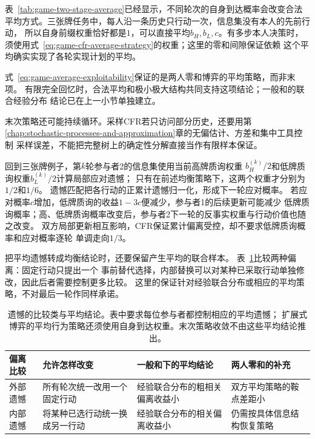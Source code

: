 表~\ref{tab:game-two-stage-average}已经显示，不同轮次的自身到达概率会改变合法
平均方式。三张牌任务中，每人沿一条历史只行动一次，信息集没有本人的先前行动，
所以自身前缀权重恰好都是\(1\)，可以直接平均\(b_H,b_L,c\)。有多步本人决策时，
须使用式~\eqref{eq:game-cfr-average-strategy}的权重；这里的零和间隙保证依赖
这个平均确实实现了各轮实现计划的平均。

式~\eqref{eq:game-average-exploitability}保证的是两人零和博弈的平均策略，而非末项。
有限完全回忆时，合法平均和极小极大结构共同支持这项结论；一般和的联合经验分布
结论已在上一小节单独建立。

末次策略还可能持续循环。采样CFR若只访问部分历史，还要用第
\ref{chap:stochastic-processes-and-approximation}章的无偏估计、方差和集中工具控制
采样误差，不能把完整树上的确定性分解直接当作有限样本保证。

回到三张牌例子，第\(k\)轮参与者2的信息集使用当前高牌质询权重
\(b_H^{(k)}/2\)和低牌质询权重\(b_L^{(k)}/2\)计算局部应对遗憾；
只有在前述均衡策略下，这两个权重才分别为\(1/2\)和\(1/6\)。
遗憾匹配把各行动的正累计遗憾归一化，形成下一轮应对概率。
若应对概率\(c\)增加，低牌质询的收益\(1-3c\)便减少，参与者1的后续更新可能减少
低牌质询概率；高、低牌质询概率改变后，参与者2下一轮的反事实权重与行动价值也随之改变。
双方局部更新相互影响，CFR保证累计偏离受控，却不要求低牌质询概率和应对概率逐轮
单调走向\(1/3\)。

把平均遗憾转成均衡结论时，还要保留产生平均的联合样本。
表~\ref{tab:game-regret-comparison-conclusions}比较两种偏离：固定行动只提出一个
事前替代选择，内部替换可以对某种已采取行动单独修改，因此后者需要控制更多比较。
这里的保证针对经验联合分布或相应的平均策略，不对最后一轮作同样承诺。

\begin{table}[htbp]
  \centering
  \begin{tabularx}{\linewidth}{lXXX}
    \toprule
    偏离比较 & 允许怎样改变 & 一般和下的平均结论 & 两人零和的补充\\
    \midrule
    外部遗憾 & 所有轮次统一改用一个固定行动 & 经验联合分布的粗相关偏离收益小 & 双方平均策略的鞍点差距小\\
    内部遗憾 & 将某种已选行动统一换成另一行动 & 经验联合分布的相关偏离收益小 & 仍需按具体信息结构恢复策略\\
    \bottomrule
  \end{tabularx}
  \caption{遗憾的比较类与平均结论。表中要求每位参与者都控制相应的平均遗憾；
  扩展式博弈的平均行为策略还须使用自身到达权重。末次策略收敛不由这些平均结论推出。}
  \label{tab:game-regret-comparison-conclusions}
\end{table}

